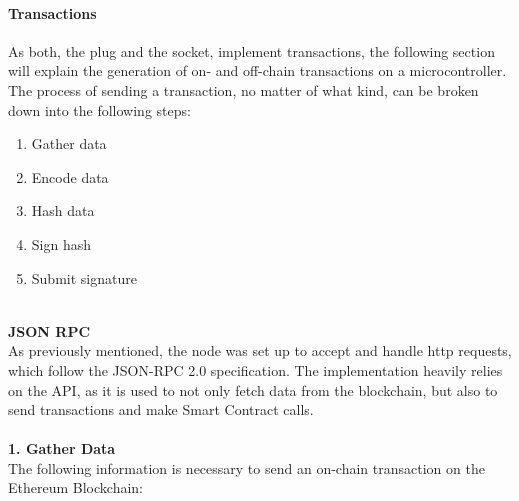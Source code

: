 \paragraph{Transactions}
As both, the plug and the socket, implement transactions, the following section will explain the generation of on- and off-chain transactions on a microcontroller. The process of sending a transaction, no matter of what kind, can be broken down into the following steps:
\begin{enumerate}
    \item Gather data
    \item Encode data
    \item Hash data
    \item Sign hash
    \item Submit signature
\end{enumerate}
\leavevmode
\\
\textbf{JSON RPC}\\
As previously mentioned, the node was set up to accept and handle http requests, which follow the JSON-RPC 2.0 specification\cite{json-rpc-spec}. The implementation heavily relies on the API, as it is used to not only fetch data from the blockchain, but also to send transactions and make Smart Contract calls\cite{json-rpc}\cite{management-apis}.
\\\\
\textbf{1. Gather Data}\\
The following information is necessary to send an on-chain transaction on the Ethereum Blockchain:
